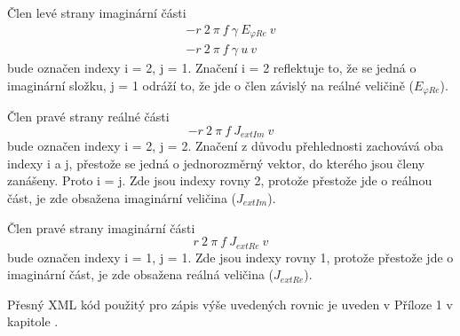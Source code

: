 \documentclass[12pt,a4paper,oneside]{article}
\numberwithin{equation}{section} %
\numberwithin{figure}{section} %
\numberwithin{table}{section} %
\begin{document}
Člen levé strany imaginární části
\begin{subequations}
\begin{gather}
- r ~ 2 ~ \pi ~ f ~ \gamma ~ E _{\varphi Re} ~ v
\\
- r ~ 2 ~ \pi ~ f ~ \gamma ~ u ~ v
\end{gather}
\end{subequations}
bude označen indexy i = 2, j = 1. Značení i = 2 reflektuje to, že se jedná o imaginární složku, j = 1 odráží to, že jde o člen závislý na reálné veličině ($E _{\varphi Re}$).

Člen pravé strany reálné části
\begin{equation}
- r ~ 2 ~ \pi ~ f ~ J _{extIm} ~ v
\end{equation}
bude označen indexy i = 2, j = 2. Značení z důvodu přehlednosti zachovává oba indexy i a j, přestože se jedná o jednorozměrný vektor, do kterého jsou členy zanášeny. Proto i = j. Zde jsou indexy rovny 2, protože přestože jde o reálnou část, je zde obsažena imaginární veličina ($J _{extIm}$).

Člen pravé strany imaginární části
\begin{equation}
r ~ 2 ~ \pi ~ f ~ J _{extRe} ~ v
\end{equation}
bude označen indexy i = 1, j = 1. Zde jsou indexy rovny 1, protože přestože jde o imaginární část, je zde obsažena reálná veličina ($J _{extRe}$).

Přesný XML kód použitý pro zápis výše uvedených rovnic je uveden v Příloze 1 v kapitole .
\end{document}
